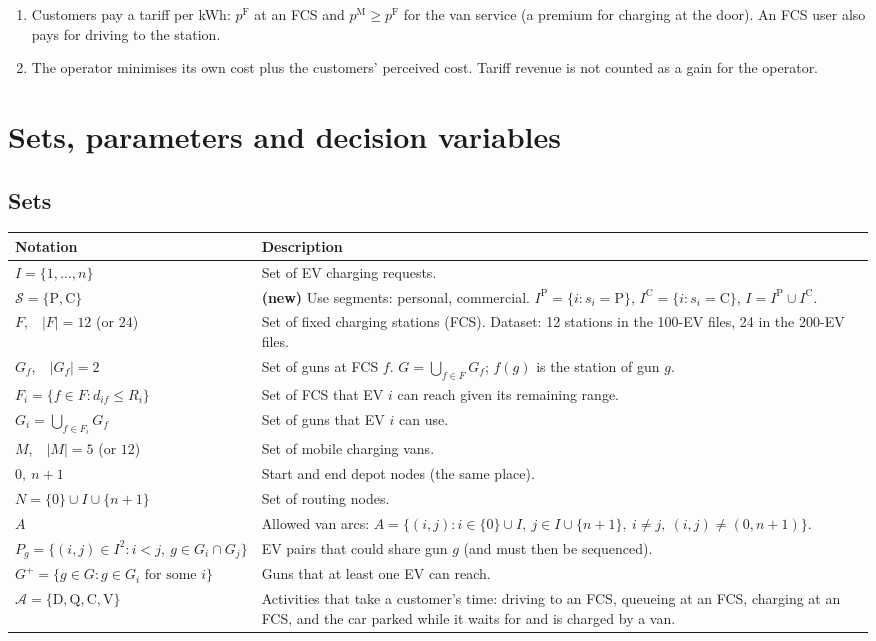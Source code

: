 \documentclass[12pt,a4paper]{article}
\begin{document}
\begin{enumerate}[itemsep=2pt]
  \item Customers pay a tariff per kWh: $p^{\mathrm F}$ at an FCS and $p^{\mathrm M}\ge p^{\mathrm F}$ for the van service (a premium for charging at the door). An FCS user also pays for driving to the station.
  \item The operator minimises its own cost plus the customers' perceived cost. Tariff revenue is not counted as a gain for the operator.
\end{enumerate}

\newpage
\section{Sets, parameters and decision variables}

\subsection*{Sets}
\begin{tabularx}{\textwidth}{@{}>{\raggedright\arraybackslash}p{4.6cm}X@{}}
\toprule
\textbf{Notation} & \textbf{Description} \\
\midrule
$I=\{1,\dots,n\}$ & Set of EV charging requests. \\[2pt]
$\mathcal S=\{\mathrm P,\mathrm C\}$ & \textbf{(new)} Use segments: personal, commercial. $I^{\mathrm P}=\{i: s_i=\mathrm P\}$, $I^{\mathrm C}=\{i: s_i=\mathrm C\}$, $I=I^{\mathrm P}\cup I^{\mathrm C}$. \\[2pt]
$F$,\ \ $|F|=12$ (or $24$) & Set of fixed charging stations (FCS). Dataset: 12 stations in the 100-EV files, 24 in the 200-EV files. \\[2pt]
$G_f$,\ \ $|G_f|=2$ & Set of guns at FCS $f$. $G=\bigcup_{f\in F}G_f$; $f(g)$ is the station of gun $g$. \\[2pt]
$F_i=\{f\in F: d_{if}\le R_i\}$ & Set of FCS that EV $i$ can reach given its remaining range. \\[2pt]
$G_i=\bigcup_{f\in F_i}G_f$ & Set of guns that EV $i$ can use. \\[2pt]
$M$,\ \ $|M|=5$ (or $12$) & Set of mobile charging vans. \\[2pt]
$0,\ n+1$ & Start and end depot nodes (the same place). \\[2pt]
$N=\{0\}\cup I\cup\{n+1\}$ & Set of routing nodes. \\[2pt]
$A$ & Allowed van arcs: $A=\{(i,j): i\in\{0\}\cup I,\ j\in I\cup\{n+1\},\ i\ne j,\ (i,j)\ne(0,n+1)\}$. \\[2pt]
$P_g=\{(i,j)\in I^2: i<j,\ g\in G_i\cap G_j\}$ & EV pairs that could share gun $g$ (and must then be sequenced). \\[2pt]
$G^{+}=\{g\in G: g\in G_i \text{ for some } i\}$ & Guns that at least one EV can reach. \\[2pt]
$\mathcal A=\{\mathrm D,\mathrm Q,\mathrm C,\mathrm V\}$ & Activities that take a customer's time: driving to an FCS, queueing at an FCS, charging at an FCS, and the car parked while it waits for and is charged by a van. \\
\bottomrule
\end{tabularx}
\end{document}

